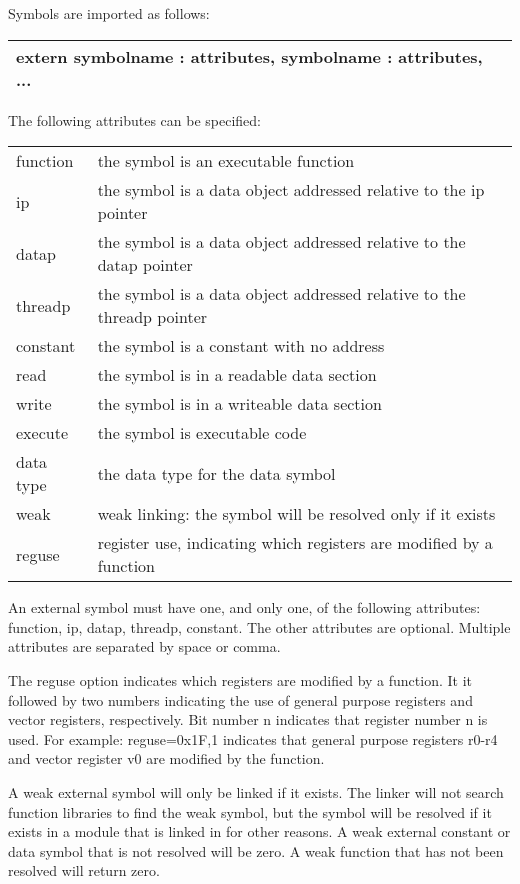\documentclass[forwardcom.tex]{subfiles}
\begin{document}
Symbols are imported as follows:
\vv

\begin{tabular}{|p{150mm}|}
\hline
\hspace{4mm} extern symbolname : attributes, symbolname : attributes, ...\\
\hline
\end{tabular}
\vv

The following attributes can be specified:
\vv

\begin{tabular}{|p{20mm}p{130mm}|}
\hline
function & the symbol is an executable function\\
ip & the symbol is a data object addressed relative to the ip pointer\\
datap & the symbol is a data object addressed relative to the datap pointer\\
threadp & the symbol is a data object addressed relative to the threadp pointer\\
constant & the symbol is a constant with no address\\
read & the symbol is in a readable data section\\
write & the symbol is in a writeable data section\\
execute & the symbol is executable code\\
data type & the data type for the data symbol\\
weak & weak linking: the symbol will be resolved only if it exists\\
reguse & register use, indicating which registers are modified by a function\\
\hline
\end{tabular}
\vv

An external symbol must have one, and only one, of the following attributes: function, ip, datap, threadp, constant.
The other attributes are optional. Multiple attributes are separated by space or comma.
\vv

The reguse option indicates which registers are modified by a function. 
It it followed by two numbers indicating the use of general purpose registers and vector registers, respectively. Bit number n indicates that register number n is used. For example: reguse=0x1F,1 indicates that general purpose registers r0-r4 and vector register v0 are modified by the function.
\vv

A weak external symbol will only be linked if it exists. The linker will not search function libraries to find the weak symbol, but the symbol will be resolved if it exists in a module that is linked in for other reasons.
A weak external constant or data symbol that is not resolved will be zero. A weak function that has not  been resolved will return zero.
\vv
\end{document}
